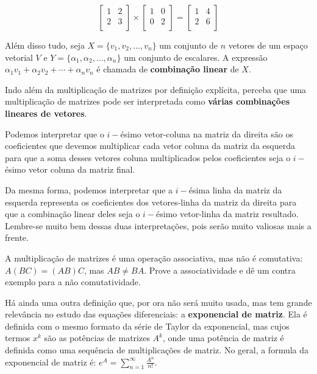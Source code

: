 \documentclass[11pt, a4paper]{article}
\begin{document}
\[
\begin{bmatrix}
1 & 2\\
2 & 3\\
\end{bmatrix}
\times
\begin{bmatrix}
1 & 0\\
0 & 2\\
\end{bmatrix}
=
\begin{bmatrix}
1 & 4\\
2 & 6\\
\end{bmatrix}
\]

Além disso tudo, seja \(X = \{v_1, v_2, \ldots, v_n\}\) um conjunto de \(n\) vetores de um espaço vetorial \(V\) e \(Y = \{\alpha_1, \alpha_2, \ldots, \alpha_n\}\) um conjunto de escalares. A expressão \(\alpha_1 v_1 + \alpha_2 v_2 + \cdots + \alpha_n v_n\) é chamada de \textbf{combinação linear} de \(X\).

Indo além da multiplicação de matrizes por definição explícita, perceba que uma multiplicação de matrizes pode ser interpretada como \textbf{várias combinações lineares de vetores}.

Podemos interpretar que o \(i-\)ésimo vetor-coluna na matriz da direita são os coeficientes que devemos multiplicar cada vetor coluna da matriz da esquerda para que a soma desses vetores coluna multiplicados pelos coeficientes seja o \(i-\)ésimo vetor coluna da matriz final.

Da mesma forma, podemos interpretar que a \(i-\)ésima linha da matriz da esquerda representa os coeficientes dos vetores-linha da matriz da direita para que a combinação linear deles seja o \(i-\)ésimo vetor-linha da matriz resultado. Lembre-se muito bem dessas duas interpretações, pois serão muito valiosas mais a frente.

A multiplicação de matrizes é uma operação associativa, mas não é comutativa: \(A(BC)=(AB)C\), mas \(AB \ne BA\). Prove a associatividade e dê um contra exemplo para a não comutatividade.

Há ainda uma outra definição que, por ora não será muito usada, mas tem grande relevância no estudo das equações diferenciais: a \textbf{exponencial de matriz}. Ela é definida com o mesmo formato da série de Taylor da exponencial, mas cujos termos \(x^k\) são as potências de matrizes \(A^k\), onde uma potência de matriz é definida como uma sequência de multiplicações de matriz. No geral, a formula da exponencial de matriz é: \(e^A=\displaystyle\sum_{n=1}^{\infty}{\frac{A^n}{n!}}\).
\end{document}
